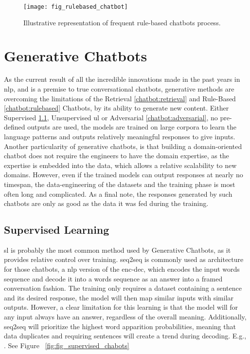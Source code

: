 \begin{figure}
    \centering
    \texttt{[image: fig\_rulebased\_chatbot]}
    \caption{Illustrative representation of frequent rule-based chatbots process.}
    \label{fig:fig_rulebased_chatbot}
\end{figure}

\section{Generative Chatbots}
\label{chatbot:generative}
As the current result of all the incredible innovations made in the past years in \gls{nlp}, and is a premise to true conversational chatbots, generative methods are overcoming the limitations of the Retrieval \ref{chatbot:retrieval} and Rule-Based \ref{chatbot:rulebased} Chatbots, by its ability to generate new content. Either Supervised \ref{chatbot:supervised}, Unsupervised \gls{ul} or Adversarial \ref{chatbot:adversarial}, no pre-defined outputs are used, the models are trained on large corpora to learn the language patterns and outputs relatively meaningful responses to give inputs. Another particularity of generative chatbots, is that building a domain-oriented chatbot does not require the engineers to have the domain expertise, as the expertise is embedded into the data, which allows a relative scalability to new domains. However, even if the trained models can output responses at nearly no timespan, the data-engineering of the datasets and the training phase is most often long and complicated. As a final note, the responses generated by such chatbots are only as good as the data it was fed during the training.

\subsection{Supervised Learning}
\label{chatbot:supervised}
\gls{sl} is probably the most common method used by Generative Chatbots, as it provides relative control over training. \gls{seq2seq} is commonly used as architecture for those chatbots, a \gls{nlp} version of the \gls{enc-dec}, which encodes the input words sequence and decode it into a words sequence as an answer into a framed conversation fashion. The training only requires a dataset containing a sentence and its desired response, the model will then map similar inputs with similar outputs. However, a clear limitation for this learning is that the model will for any input always have an answer, regardless of the overall meaning. Additionally, \gls{seq2seq} will prioritize the highest word apparition probabilities, meaning that data duplicates and requiring sentences will create a trend during decoding. E.g., . See Figure ~\ref{fig:fig_supervised_chabots} 

